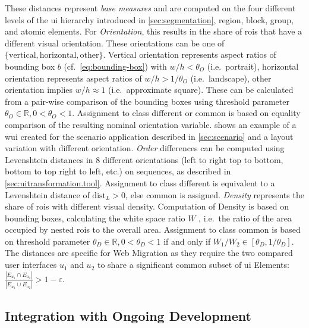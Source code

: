 These distances represent \emph{base measures} \autocite{ISO/IEEE2017Measurement} and are computed on the four different levels of the \gls{ui} hierarchy introduced in \cref{sec:segmentation}, region, block, group, and atomic elements.
For \emph{Orientation}, this results in the share of \glspl{roi} that have a different visual orientation.
These orientations can be one of \(\{\text{vertical}, \text{horizontal}, \text{other}\}\).
Vertical orientation represents aspect ratios of bounding box \(b\) (cf.~\cref{eq:bounding-box}) with \(w/h < \theta_O\) (i.e.~portrait), horizontal orientation represents aspect ratios of \(w/h > 1 / \theta_O\) (i.e.~landscape), other orientation implies \(w/h \approx 1\) (i.e.~approximate square).
These can be calculated from a pair-wise comparison of the bounding boxes using threshold parameter \(\theta_O\in\mathbb{R}, 0<\theta_O < 1\).
Assignment to class \(\text{different}\) or \(\text{common}\) is based on equality comparison of the resulting nominal orientation variable.
 shows an example of a \gls{wui} created for the scenario application described in \cref{sec:scenario} and a layout variation with different orientation.
\emph{Order} differences can be computed using Levenshtein distances in 8 different orientations (left to right top to bottom, bottom to top right to left, etc.) on sequences, as described in \cref{sec:uitransformation.tool}.
Assignment to class \(\text{different}\) is equivalent to a Levenshtein distance of \(\text{dist}_L > 0\), else \(\text{common}\) is assigned.
\emph{Density} represents the share of \glspl{roi} with different visual density.
Computation of Density is based on bounding boxes, calculating the white space ratio \(W\) \autocite{Bakaev2019JWE}, i.e.~the ratio of the area occupied by nested \glspl{roi} to the overall area.
Assignment to class \(\text{common}\) is based on threshold parameter \(\theta_D\in\mathbb{R}, 0<\theta_D < 1\) if and only if \(W_1/W_2 \in [ \theta_D, 1/\theta_D]\).
The distances are specific for \gls{Web Migration} as they require the two compared user interfaces \(u_1\) and \(u_2\) to share a significant common subset of \gls{ui} Elements: \(\frac{|E_{u_1} \cap E_{u_2}|}{|E_{u_1} \cup E_{u_2}|} > 1 - \varepsilon\).

\hypertarget{sec:ci.integration}{%
\subsection{Integration with Ongoing Development}\label{sec:ci.integration}}
\vspace{10pt}

